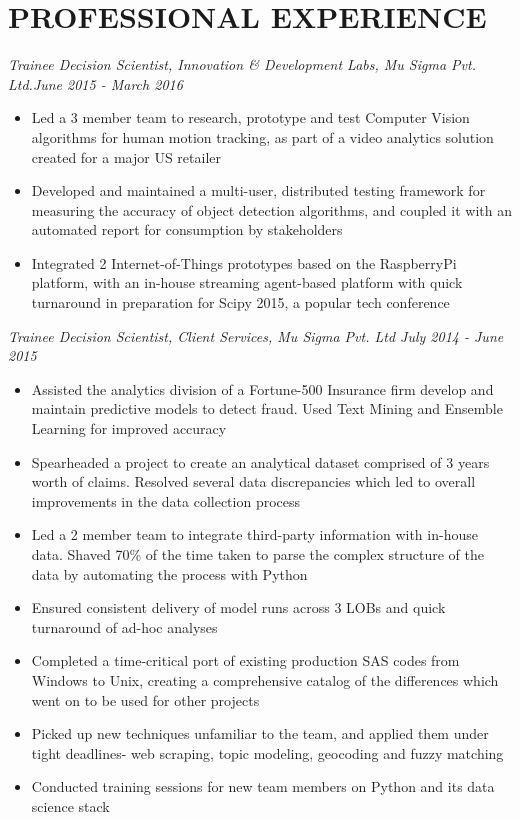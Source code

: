 \documentclass{article}
\begin{document}
\section*{PROFESSIONAL EXPERIENCE}
\noindent
\textit{Trainee Decision Scientist, Innovation \& Development Labs, Mu Sigma Pvt. Ltd.\hfill June 2015 - March 2016}
\begin{itemize}
	\item Led a 3 member team to research, prototype and test Computer Vision algorithms for human motion
tracking, as part of a video analytics solution created for a major US retailer
	\item Developed and maintained a multi-user, distributed testing framework for measuring the accuracy of object
detection algorithms, and coupled it with an automated report for consumption by stakeholders
	\item Integrated 2 Internet-of-Things prototypes based on the RaspberryPi platform, with an in-house streaming agent-based platform with quick turnaround in preparation for Scipy 2015, a popular tech conference
\end{itemize}
\textit{Trainee Decision Scientist, Client Services, Mu Sigma Pvt. Ltd \hfill July 2014 - June 2015}
\begin{itemize}
	\item Assisted the analytics division of a Fortune-500 Insurance firm develop and maintain predictive models to detect fraud. Used Text Mining and Ensemble Learning for improved accuracy
	\item Spearheaded a project to create an analytical dataset comprised of 3 years worth of claims. Resolved several data discrepancies which led to 
        overall improvements in the data collection process
    \item Led a 2 member team to integrate third-party information with in-house data. Shaved 70\% of the time taken
to parse the complex structure of the data by automating the process with Python
	\item Ensured consistent delivery of model runs across 3 LOBs and quick turnaround of ad-hoc analyses
	\item Completed a time-critical port of existing production SAS codes from Windows to Unix, creating a
comprehensive catalog of the differences which went on to be used for other projects
	\item Picked up new techniques unfamiliar to the team, and applied them under tight deadlines- web scraping,
topic modeling, geocoding and fuzzy matching
	\item Conducted training sessions for new team members on Python and its data science stack
\end{itemize}
\end{document}
